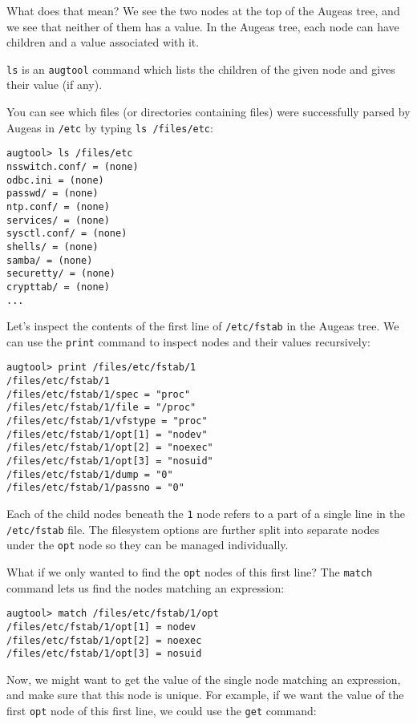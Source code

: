 What does that mean? We see the two nodes at the top of the Augeas tree, and we see that neither of them has a value. In the Augeas tree, each node can have children and a value associated with it.

\verb!ls! is an \verb!augtool! command which lists the children of the given node and gives their value (if any).

You can see which files (or directories containing files) were successfully parsed by Augeas in \nolinkurl{/etc} by typing \verb!ls /files/etc!:

\begin{verbatim}
augtool> ls /files/etc
nsswitch.conf/ = (none)
odbc.ini = (none)
passwd/ = (none)
ntp.conf/ = (none)
services/ = (none)
sysctl.conf/ = (none)
shells/ = (none)
samba/ = (none)
securetty/ = (none)
crypttab/ = (none)
...
\end{verbatim}


Let's inspect the contents of the first line of \nolinkurl{/etc/fstab} in the Augeas tree. We can use the \verb!print! command to inspect nodes and their values recursively:

\begin{verbatim}
augtool> print /files/etc/fstab/1
/files/etc/fstab/1
/files/etc/fstab/1/spec = "proc"
/files/etc/fstab/1/file = "/proc"
/files/etc/fstab/1/vfstype = "proc"
/files/etc/fstab/1/opt[1] = "nodev"
/files/etc/fstab/1/opt[2] = "noexec"
/files/etc/fstab/1/opt[3] = "nosuid"
/files/etc/fstab/1/dump = "0"
/files/etc/fstab/1/passno = "0"
\end{verbatim}

Each of the child nodes beneath the \verb!1! node refers to a part of a single line in the \nolinkurl{/etc/fstab} file. The filesystem options are further split into separate nodes under the \verb!opt! node so they can be managed individually.

What if we only wanted to find the \verb!opt! nodes of this first line? The \verb!match! command lets us find the nodes matching an expression:


\begin{verbatim}
augtool> match /files/etc/fstab/1/opt
/files/etc/fstab/1/opt[1] = nodev
/files/etc/fstab/1/opt[2] = noexec
/files/etc/fstab/1/opt[3] = nosuid
\end{verbatim}

Now, we might want to get the value of the single node matching an expression, and make sure that this node is unique. For example, if we want the value of the first \verb!opt! node of this first line, we could use the \verb!get! command:

